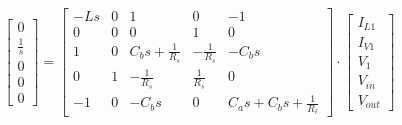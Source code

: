 \begin{equation}
\left[\begin{matrix}0\\\frac{1}{s}\\0\\0\\0\end{matrix}\right]=\left[\begin{matrix}- L s & 0 & 1 & 0 & -1\\0 & 0 & 0 & 1 & 0\\1 & 0 & C_{b} s + \frac{1}{R_{s}} & - \frac{1}{R_{s}} & - C_{b} s\\0 & 1 & - \frac{1}{R_{s}} & \frac{1}{R_{s}} & 0\\-1 & 0 & - C_{b} s & 0 & C_{a} s + C_{b} s + \frac{1}{R_{\ell}}\end{matrix}\right]\cdot \left[\begin{matrix}I_{L1}\\I_{V1}\\V_{1}\\V_{in}\\V_{out}\end{matrix}\right]
\label{eq-matrices}
\end{equation}

